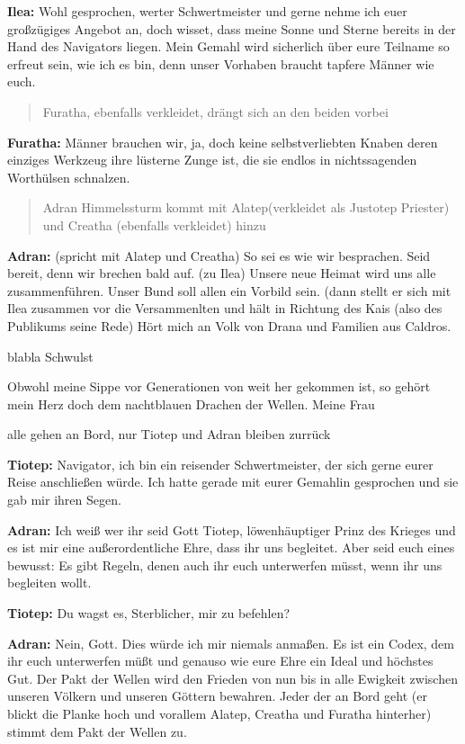 \documentclass[a5paper,6pt]{book}
\begin{document}
\textbf{Ilea:} Wohl gesprochen, werter Schwertmeister und gerne nehme ich euer großzügiges
Angebot an, doch wisset, dass meine Sonne und Sterne bereits in der Hand des
Navigators liegen. Mein Gemahl wird sicherlich über eure Teilname so erfreut sein,
wie ich es bin, denn unser Vorhaben braucht tapfere Männer wie euch.

\begin{quote}
Furatha, ebenfalls verkleidet, drängt sich an den beiden vorbei
\end{quote}


\textbf{Furatha:} Männer brauchen wir, ja, doch keine selbstverliebten Knaben deren einziges
Werkzeug ihre lüsterne Zunge ist, die sie endlos in nichtssagenden Worthülsen
schnalzen.

\begin{quote}
Adran Himmelssturm kommt mit Alatep(verkleidet als Justotep Priester) und Creatha
(ebenfalls verkleidet) hinzu
\end{quote}


\textbf{Adran:} (spricht mit Alatep und Creatha) So sei es wie wir besprachen. Seid bereit, denn wir
brechen bald auf.
(zu Ilea) Unsere neue Heimat wird uns alle zusammenführen. Unser Bund soll allen ein
Vorbild sein.
(dann stellt er sich mit Ilea zusammen vor die Versammenlten und hält in Richtung des Kais
(also des Publikums seine Rede)
Hört mich an Volk von Drana und Familien aus Caldros.

blabla Schwulst

Obwohl meine Sippe vor Generationen von weit her gekommen ist, so gehört mein Herz doch
dem nachtblauen Drachen der Wellen. Meine Frau

alle gehen an Bord, nur Tiotep und Adran bleiben zurrück

\textbf{Tiotep:} Navigator, ich bin ein reisender Schwertmeister, der sich gerne eurer Reise
anschließen würde. Ich hatte gerade mit eurer Gemahlin gesprochen und sie gab mir
ihren Segen.

\textbf{Adran:} Ich weiß wer ihr seid Gott Tiotep, löwenhäuptiger Prinz des Krieges und es ist mir
eine außerordentliche Ehre, dass ihr uns begleitet. Aber seid euch eines bewusst: Es
gibt Regeln, denen auch ihr euch unterwerfen müsst, wenn ihr uns begleiten wollt.

\textbf{Tiotep:} Du wagst es, Sterblicher, mir zu befehlen?

\textbf{Adran:} Nein, Gott. Dies würde ich mir niemals anmaßen. Es ist ein Codex, dem ihr euch
unterwerfen müßt und genauso wie eure Ehre ein Ideal und höchstes Gut. Der Pakt
der Wellen wird den Frieden von nun bis in alle Ewigkeit zwischen unseren Völkern
und unseren Göttern bewahren. Jeder der an Bord geht (er blickt die Planke hoch und
vorallem Alatep, Creatha und Furatha hinterher) stimmt dem Pakt der Wellen zu.
\end{document}
